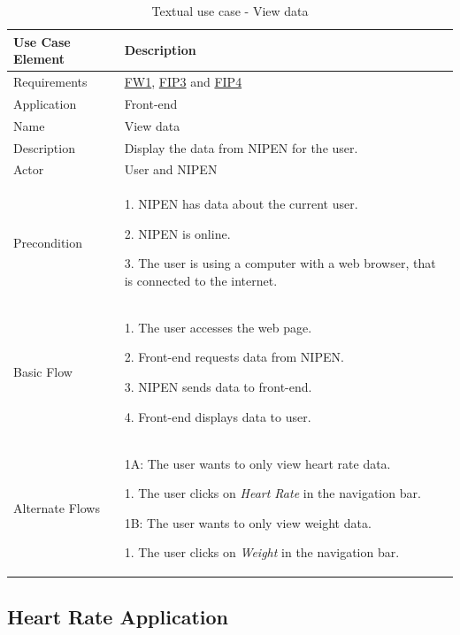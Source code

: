 \begin{table}[H]
\begin{center}
\begin{tabular}{ l | p{10cm} }
  \hline
  \textbf{Use Case Element} & \textbf{Description} \\ \hline\hline
  Requirements & \hyperref[table:reqfrontend]{FW1}, \hyperref[table:reqip]{FIP3} and \hyperref[table:reqip]{FIP4}\\ \hline
  Application & Front-end \\ \hline
  Name & View data \\ \hline
  Description & Display the data from NIPEN for the user. \\ \hline
  Actor & User and NIPEN \\ \hline
  Precondition &
	\par 1. NIPEN has data about the current user.
	\par 2. NIPEN is online.
	\par 3. The user is using a computer with a web browser, that is connected to the internet.
	\\ \hline
  Basic Flow & 
  	\par 1. The user accesses the web page.
  	\par 2. Front-end requests data from NIPEN.
  	\par 3. NIPEN sends data to front-end.
  	\par 4. Front-end displays data to user.
  	\\ \hline
  Alternate Flows & 
  	\par 1A: The user wants to only view heart rate data.
  	\par\hspace{15pt} 1. The user clicks on \textit{Heart Rate} in the navigation bar.
  	\par 1B: The user wants to only view weight data.
  	\par\hspace{15pt} 1. The user clicks on \textit{Weight} in the navigation bar.
  \\ \hline
\end{tabular}
\end{center}
\caption{Textual use case - View data}
\label{table:use-case-view-data}
\end{table}

\subsection{Heart Rate Application}

